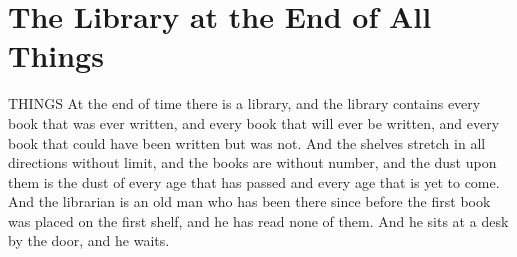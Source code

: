 \documentclass[12pt,openany]{book}
\begin{document}
\chapter{The Library at the End of All Things}

THINGS At the end of time there is a library, and the library contains every book that was ever written, and every book that will ever be written, and every book that could have been written but was not. And the shelves stretch in all directions without limit, and the books are without number, and the dust upon them is the dust of every age that has passed and every age that is yet to come. And the librarian is an old man who has been there since before the first book was placed on the first shelf, and he has read none of them. And he sits at a desk by the door, and he waits.
\end{document}
